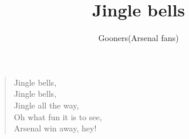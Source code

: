 \documentclass[a4paper,12pt]{article}
\title{Jingle bells}
\author{Gooners(Arsenal fans)}
\date{}
\begin{document}
	
	\maketitle
	
	\begin{verse}
		
		Jingle bells, \\
		Jingle bells, \\
		Jingle all the way, \\
		Oh what fun it is to see, \\
		Arsenal win away, hey!
		
	\end{verse}
	
\end{document}
